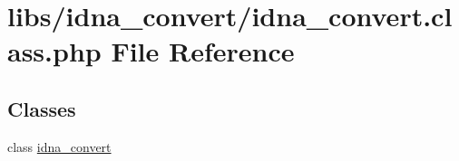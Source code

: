 \hypertarget{idna__convert_8class_8php}{\section{libs/idna\-\_\-convert/idna\-\_\-convert.class.\-php File Reference}
\label{idna__convert_8class_8php}
}
\subsection*{Classes}
\begin{DoxyCompactItemize}
\item 
class \hyperlink{classidna__convert}{idna\-\_\-convert}
\end{DoxyCompactItemize}
